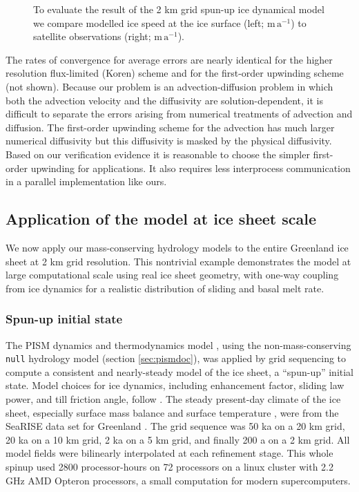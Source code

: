 \documentclass[gmd]{copernicus}   %
\begin{document}
\begin{figure}[ht]
\caption{To evaluate the result of the 2 km grid spun-up ice dynamical model we compare modelled ice speed at the ice surface (left; $\mathrm{m}\,\mathrm{a}^{-1}$) to satellite observations (right; $\mathrm{m}\,\mathrm{a}^{-1}$).}
\label{fig:Greenspinupeval}
\end{figure}

The rates of convergence for average errors are nearly identical for the higher resolution flux-limited (Koren) scheme and for the first-order upwinding scheme (not shown).  Because our problem is an advection-diffusion problem in which both the advection velocity and the diffusivity are solution-dependent, it is difficult to separate the errors arising from numerical treatments of advection and diffusion.  The first-order upwinding scheme for the advection has much larger numerical diffusivity but this diffusivity is masked by the physical diffusivity.  Based on our verification evidence it is reasonable to choose the simpler first-order upwinding for applications.  It also requires less interprocess communication in a parallel implementation like ours.


\subsection{Application of the model at ice sheet scale}

We now apply our mass-conserving hydrology models to the entire Greenland ice sheet at 2 km grid resolution.  This nontrivial example demonstrates the model at large computational scale using real ice sheet geometry, with one-way coupling from ice dynamics for a realistic distribution of sliding and basal melt rate.

\subsubsection{Spun-up initial state}  The PISM dynamics and thermodynamics model \citep{BBssasliding,Winkelmannetal2011,AschwandenBuelerKhroulevBlatter}, using the non-mass-conserving \texttt{null} hydrology model (section \ref{sec:pismdoc}), was applied by grid sequencing to compute a consistent and nearly-steady model of the ice sheet, a ``spun-up'' initial state.  Model choices for ice dynamics, including enhancement factor, sliding law power, and till friction angle, follow \cite{AschwandenAdalgeirsdottirKhroulev}.  The steady present-day climate of the ice sheet, especially surface mass balance and surface temperature \citep{Ettemaetal2009}, were from the SeaRISE data set for Greenland \citep{Bindschadler2013SeaRISE}.  The grid sequence was 50 ka on a 20 km grid, 20 ka on a 10 km grid, 2 ka on a 5 km grid, and finally 200 a on a 2 km grid.  All model fields were bilinearly interpolated at each refinement stage.  This whole spinup used 2800 processor-hours on 72 processors on a linux cluster with 2.2 GHz AMD Opteron processors, a small computation for modern supercomputers.
\end{document}

